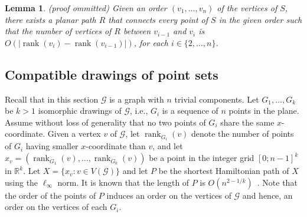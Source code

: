 \documentclass{patmorin}
\newcommand{\appendixproof}{(proof ommitted)\xspace}
\newtheorem{lemma}[theorem]{Lemma}
\DeclareMathOperator{\rank}{rank}
\begin{document}
\begin{lemma}\label{lemma:Compatible augmentation for trivial components} \appendixproof
Given an order $(v_1, \ldots, v_n)$ of the vertices of $S$, there exists a planar path $R$ that connects every point of $S$ in the given order such that the number of vertices of $R$ between $v_{i-1}$ and $v_{i}$ is $O(|\rank(v_i) - \rank(v_{i-1})|)$, for each $i\in \{2,\dots,n\}$.
\end{lemma}

\subsection{Compatible drawings of point sets}%
Recall that in this section $\mathcal G$ is a graph with $n$ trivial components.
Let $G_1, \ldots, G_k$ be $k>1$ isomorphic drawings of $\mathcal G$, i.e., $G_i$ is a sequence of $n$ points in the plane.
Assume without loss of generality that no two points of $G_i$ share the same $x$-coordinate.
Given a vertex $v$ of $\mathcal G$, let $\rank_{G_i}(v)$ denote the number of points of $G_i$ having smaller $x$-coordinate than $v$, and let $x_v = (\rank_{G_1}(v), \ldots, \rank_{G_k}(v))$ be a point in the integer grid $[0;n-1]^k$ in $\mathbb{R}^k$.  Let $X = \{x_v : v\in V(\mathcal G)\}$ and let $P$ be the shortest Hamiltonian path of $X$ using the $\ell_\infty$ norm.  It is known that the length of
$P$ is $O(n^{2-1/k})$~\cite{few:shortest,moran:on}.
Note that the order of the points of $P$ induces an order on the vertices of $\mathcal G$ and hence, an order on the vertices of each $G_i$.
\end{document}
